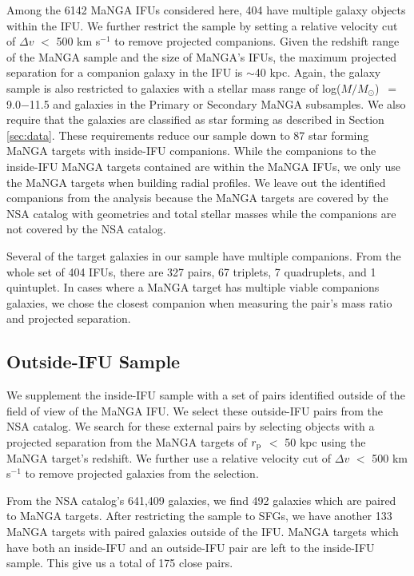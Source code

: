 \documentclass[iop,revtex4,twocolumn,apj,numberedappendix,appendixfloats]{emulateapj}
\newcommand{\logm}{log($M/M_{\odot}$)}
\begin{document}
Among the 6142 MaNGA IFUs considered here, 404 have multiple galaxy objects within the IFU. We further restrict the sample by setting a relative velocity cut of $\Delta v$ $<$ 500 km s$^{-1}$ to remove projected companions. Given the redshift range of the MaNGA sample and the size of MaNGA's IFUs, the maximum projected separation for a companion galaxy in the IFU is $\sim$40 kpc. Again, the galaxy sample is also restricted to galaxies with a stellar mass range of \logm\ $=$ 9.0$-$11.5 and galaxies in the Primary or Secondary MaNGA subsamples. We also require that the galaxies are classified as star forming as described in Section \ref{sec:data}. These requirements reduce our sample down to 87 star forming MaNGA targets with inside-IFU companions. While the companions to the inside-IFU MaNGA targets contained are within the MaNGA IFUs, we only use the MaNGA targets when building radial profiles. We leave out the identified companions from the analysis because the MaNGA targets are covered by the NSA catalog with geometries and total stellar masses while the companions are not covered by the NSA catalog. 

Several of the target galaxies in our sample have multiple companions. From the whole set of 404 IFUs, there are 327 pairs, 67 triplets, 7 quadruplets, and 1 quintuplet. In cases where a MaNGA target has multiple viable companions galaxies, we chose the closest companion when measuring the pair's mass ratio and projected separation. 

\subsection{Outside-IFU Sample}\label{sec:outside}

We supplement the inside-IFU sample with a set of pairs identified outside of the field of view of the MaNGA IFU. We select these outside-IFU pairs from the NSA catalog. We search for these external pairs by selecting objects with a projected separation from the MaNGA targets of $r_{\rm p}$ $<$ 50 kpc using the MaNGA target's redshift. We further use a relative velocity cut of $\Delta v$ $<$ 500 km s$^{-1}$ to remove projected galaxies from the selection. 

From the NSA catalog's 641,409 galaxies, we find 492 galaxies which are paired to MaNGA targets. After restricting the sample to SFGs, we have another 133 MaNGA targets with paired galaxies outside of the IFU. MaNGA targets which have both an inside-IFU and an outside-IFU pair are left to the inside-IFU sample. This give us a total of 175 close pairs.
\end{document}

